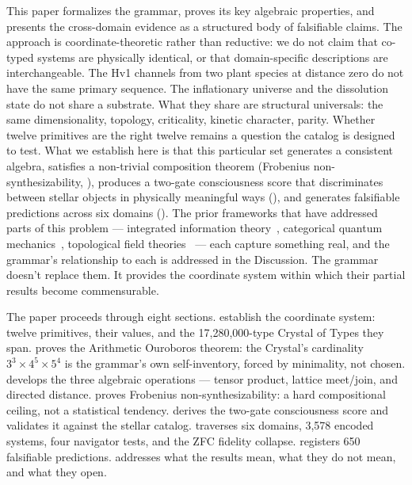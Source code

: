 \documentclass[12pt,a4paper]{article}
\begin{document}
This paper formalizes the grammar, proves its key algebraic properties,
and presents the cross-domain evidence as a structured body of
falsifiable claims. The approach is coordinate-theoretic rather than
reductive: we do not claim that co-typed systems are physically
identical, or that domain-specific descriptions are interchangeable.
The Hv1 channels from two plant species at distance zero do not have
the same primary sequence. The inflationary universe and the
dissolution state do not share a substrate. What they share are
structural universals: the same dimensionality, topology, criticality,
kinetic character, parity. Whether twelve primitives are the right
twelve remains a question the catalog is designed to test. What we
establish here is that this particular set generates a consistent
algebra, satisfies a non-trivial composition theorem (Frobenius
non-synthesizability, ), produces a two-gate
consciousness score that discriminates between stellar objects in
physically meaningful ways (), and generates
falsifiable predictions across six domains ().
The prior frameworks that have addressed parts of this problem ---
integrated information theory~\cite{tononi2004,tononi2016}, categorical
quantum mechanics~\cite{abramsky2004}, topological field
theories~\cite{atiyah1988} --- each capture something real, and the
grammar's relationship to each is addressed in the Discussion. The
grammar doesn't replace them. It provides the coordinate system within
which their partial results become commensurable.

The paper proceeds through eight sections.
 establish the coordinate system:
twelve primitives, their values, and the 17,280,000-type Crystal
of Types they span.  proves the Arithmetic
Ouroboros theorem: the Crystal's cardinality $3^3 \times 4^5
\times 5^4$ is the grammar's own self-inventory, forced by
minimality, not chosen.  develops the three
algebraic operations --- tensor product, lattice meet/join, and
directed distance.  proves Frobenius
non-synthesizability: a hard compositional ceiling, not a
statistical tendency.  derives the
two-gate consciousness score and validates it against the stellar
catalog.  traverses six domains, 3,578
encoded systems, four navigator tests, and the ZFC fidelity
collapse.  registers 650 falsifiable
predictions.  addresses what the results
mean, what they do not mean, and what they open.
\end{document}
